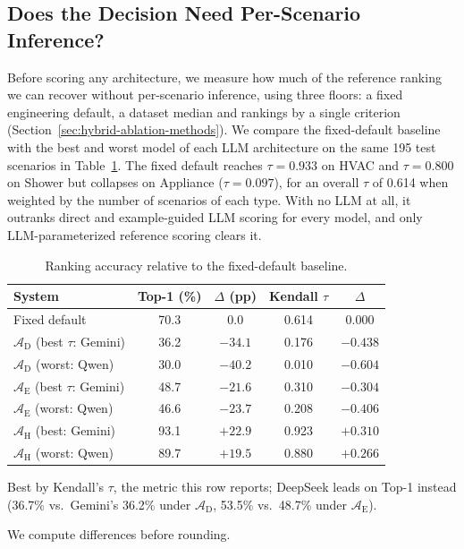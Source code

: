 \documentclass[final,3p,times]{elsarticle}
\begin{document}
\FloatBarrier
\subsection{Does the Decision Need Per-Scenario Inference?}
\label{sec:res-baselines}
Before scoring any architecture, we measure how much of the reference ranking we can recover without per-scenario inference, using three floors: a fixed engineering default, a dataset median and rankings by a single criterion (Section~\ref{sec:hybrid-ablation-methods}). We compare the fixed-default baseline with the best and worst model of each LLM architecture on the same 195 test scenarios in Table~\ref{tab:incremental-contribution}. The fixed default reaches $\tau = 0.933$ on HVAC and $\tau = 0.800$ on Shower but collapses on Appliance ($\tau = 0.097$), for an overall $\tau$ of 0.614 when weighted by the number of scenarios of each type. With no LLM at all, it outranks direct and example-guided LLM scoring for every model, and only LLM-parameterized reference scoring clears it.

\begin{table}[htbp]
\caption{Ranking accuracy relative to the fixed-default baseline.}
\label{tab:incremental-contribution}
\centering
\begin{threeparttable}
  \centering
  \footnotesize
  \begin{tabular}{lcccc}
    \toprule
    System & Top-1 (\%) & $\Delta$ (pp) & Kendall $\tau$ & $\Delta$ \\
    \midrule
    Fixed default & 70.3 & $0.0$ & 0.614 & $0.000$ \\
    $\mathcal{A}_{\text{D}}$ (best $\tau$: Gemini)\tnote{a} & 36.2 & $-34.1$ & 0.176 & $-0.438$ \\
    $\mathcal{A}_{\text{D}}$ (worst: Qwen)   & 30.0 & $-40.2$ & 0.010 & $-0.604$ \\
    \addlinespace
    $\mathcal{A}_{\text{E}}$ (best $\tau$: Gemini)\tnote{a} & 48.7 & $-21.6$ & 0.310 & $-0.304$ \\
    $\mathcal{A}_{\text{E}}$ (worst: Qwen)    & 46.6 & $-23.7$ & 0.208 & $-0.406$ \\
    \addlinespace
    $\mathcal{A}_{\text{H}}$ (best: Gemini) & 93.1 & $+22.9$ & 0.923 & $+0.310$ \\
    $\mathcal{A}_{\text{H}}$ (worst: Qwen)  & 89.7 & $+19.5$ & 0.880 & $+0.266$ \\
    \bottomrule
  \end{tabular}
  \begin{tablenotes}
  \footnotesize
  \item[a] Best by Kendall's $\tau$, the metric this row reports; DeepSeek leads on Top-1 instead (36.7\% vs.\ Gemini's 36.2\% under $\mathcal{A}_{\text{D}}$, 53.5\% vs.\ 48.7\% under $\mathcal{A}_{\text{E}}$).
  \item[] We compute differences before rounding.
  \end{tablenotes}
\end{threeparttable}
\end{table}
\FloatBarrier
\end{document}
